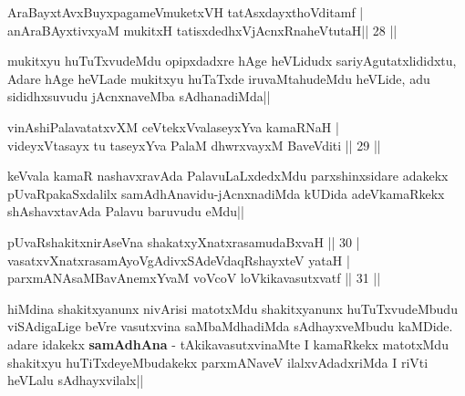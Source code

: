 
\begin{shl}
AraBayxtAvxBuyxpagameVmuketxVH tatAsxdayxthoVditamf |\\
anAraBAyxtivxyaM mukitxH tatisxdedhxVjAcnxRnaheVtutaH\hfill || 28 ||
\end{shl}

\begin{artha}
mukitxyu huTuTxvudeMdu opipxdadxre hAge heVLidudx sariyAgutatxlididxtu, Adare hAge heVLade mukitxyu huTaTxde iruvaMtahudeMdu heVLide, adu sididhxsuvudu jAcnxnaveMba sAdhanadiMda||
\end{artha}


\begin{shl}
vinAshiPalavatatxvXM ceVtekxVvalaseyxYva kamaRNaH |\\
videyxVtasayx tu taseyxYva PalaM dhwrxvayxM BaveVditi \hfill || 29 ||
\end{shl}

\begin{artha}
keVvala kamaR nashavxravAda PalavuLaLxdedxMdu parxshinxsidare adakekx pUvaRpakaSxdalilx samAdhAnavidu-jAcnxnadiMda kUDida adeVkamaRkekx shAshavxtavAda Palavu baruvudu eMdu||
\end{artha}


\begin{shl}
pUvaRshakitxnirAseVna shakatxyXnatxrasamudaBxvaH \hfill || 30 |\\
vasatxvXnatxrasamAyoVgAdivxSAdeVdaqRshayxteV yataH |\\
parxmANAsaMBavAnemxYvaM voVcoV loVkikavasutxvatf \hfill || 31 ||
\end{shl}

\begin{artha}
hiMdina shakitxyanunx nivArisi matotxMdu shakitxyanunx huTuTxvudeMbudu viSAdigaLige beVre vasutxvina saMbaMdhadiMda sAdhayxveMbudu kaMDide. adare idakekx \textbf{samAdhAna} - tAkikavasutxvinaMte I kamaRkekx matotxMdu shakitxyu huTiTxdeyeMbudakekx parxmANaveV ilalxvAdadxriMda I riVti heVLalu sAdhayxvilalx||
\end{artha}
